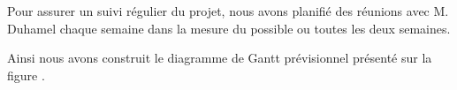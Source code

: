 
		Pour assurer un suivi régulier du projet, nous avons planifié des réunions avec M. Duhamel chaque semaine dans la mesure du possible ou toutes les deux semaines.

		Ainsi nous avons construit le diagramme de Gantt prévisionnel présenté sur la figure .
